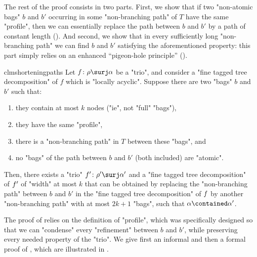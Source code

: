 The rest of the proof consists in two parts.
First, we show that if two "non-atomic bags" $b$ and $b'$
occurring in some "non-branching path"
of $T$ have the same "profile", then we can essentially replace 
the path between $b$ and $b'$ by a path of constant length (). And second, we show that in every sufficiently long "non-branching path"
we can find $b$ and $b'$ satisfying the aforementioned property: this
part simply relies on an enhanced ``pigeon-hole principle'' ().

\begin{restatable}{clm}{shorteningpaths}
    \AP\label{claim:shortening-paths}
	Let $\fun\colon \rho \surj \alpha$ be a "trio", and consider a
	"fine tagged tree decomposition" of $f$ which is "locally acyclic".
    Suppose there are two "bags" $b$ and $b'$ such that:
	\begin{enumerate}
		\item they contain at most $k$ nodes ("ie", not "full" "bags"),
		\item they have the same "profile",
		\item there is a "non-branching path" in $T$ between these "bags", and
		\item no "bags" of the path between $b$ and $b'$ (both included) are "atomic".
	\end{enumerate}
	Then, there exists a "trio" $\fun'\colon \rho' \surj \alpha'$ and a
    "fine tagged tree decomposition" of $f'$ of "width" at most $k$
    that can be obtained by replacing the "non-branching path" between $b$ and $b'$
    in the "fine tagged tree decom\-position" of
    $f$ by another "non-branching path" with at most 
    $2k+1$ "bags", such that $\alpha \contained \alpha'$.
\end{restatable}
The proof of  relies on the definition of "profile", which
was specifically designed so that we can "condense" every "refinement" between $b$ and $b'$,
while preserving every needed property of the "trio".
We give first an informal and then a formal proof of , which are 
illustrated in .

